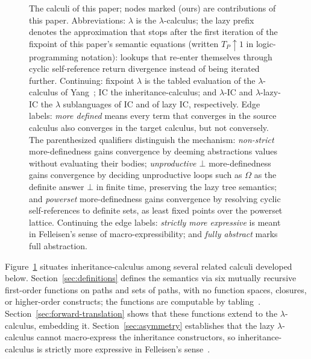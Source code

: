 \begin{figure}
  \caption{The calculi of this paper; nodes marked
    (ours) are contributions of this paper.
    Abbreviations:
    $\lambda$ is the $\lambda$-calculus;
    the lazy prefix denotes the approximation that stops after the first
    iteration of the fixpoint of this paper's semantic equations
    (written $T_P\!\uparrow\!1$ in
    logic-programming notation): lookups that re-enter themselves
    through cyclic self-reference return divergence instead of being
    iterated further.
    Continuing:
    fixpoint $\lambda$ is the tabled evaluation of the
    $\lambda$-calculus of Yang~\cite{yang2026-co-lambda};
    IC the inheritance-calculus;
    and $\lambda$-IC and $\lambda$-lazy-IC the $\lambda$ sublanguages of
    IC and of lazy IC, respectively.
    Edge labels:
    \emph{more defined} means every term that converges in the source
    calculus also converges in the target calculus, but not conversely.
    The parenthesized qualifiers distinguish the mechanism:
    \emph{non-strict} more-definedness gains convergence by deeming
    abstractions values without evaluating their bodies;
    \emph{unproductive $\bot$} more-definedness gains convergence by
    deciding unproductive loops such as $\Omega$ as the definite answer
    $\bot$ in finite time, preserving the lazy tree semantics;
    and \emph{powerset} more-definedness gains convergence by
    resolving cyclic self-references to definite sets, as least fixed
    points over the powerset lattice.
    Continuing the edge labels:
    \emph{strictly more expressive} is meant in Felleisen's sense of
    macro-expressibility;
    and \emph{fully abstract} marks full abstraction.}
  \label{fig:calculi-matrix}
\end{figure}

Figure~\ref{fig:calculi-matrix} situates inheritance-calculus among
several related calculi developed below.
Section~\ref{sec:definitions} defines the semantics via six
mutually recursive first-order functions on paths and sets of paths,
with no function spaces, closures, or higher-order constructs;
the functions are computable by
tabling~\cite{tamaki1986-tabled-resolution}.
Section~\ref{sec:forward-translation} shows that
these functions extend to the $\lambda$-calculus, embedding it.
Section~\ref{sec:asymmetry} establishes that the lazy
$\lambda$-calculus cannot macro-express the inheritance constructors,
so inheritance-calculus is strictly more expressive in
Felleisen's sense~\cite{felleisen1991-expressive-power}.

